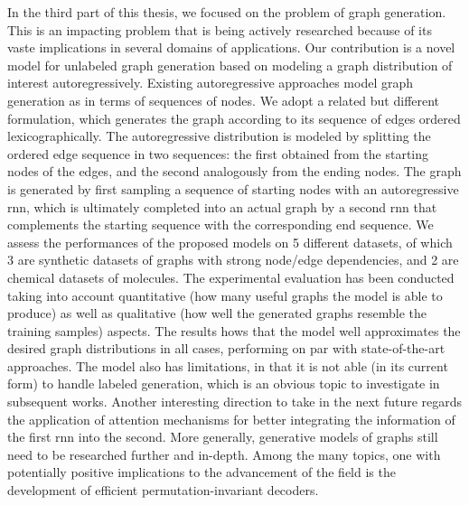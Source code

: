 In the third part of this thesis, we focused on the problem of graph generation. This is an impacting problem that is being actively researched because of its vaste implications in several domains of applications. Our contribution is a novel model for unlabeled graph generation based on modeling a graph distribution of interest autoregressively. Existing autoregressive approaches model graph generation as in terms of sequences of nodes. We adopt a related but different formulation, which generates the graph according to its sequence of edges ordered lexicographically. The autoregressive distribution is modeled by splitting the ordered edge sequence in two sequences: the first obtained from the starting nodes of the edges, and the second analogously from the ending nodes. The graph is generated by first sampling a sequence of starting nodes with an autoregressive \gls{rnn}, which is ultimately completed into an actual graph by a second \gls{rnn} that complements the starting sequence with the corresponding end sequence. We assess the performances of the proposed models on 5 different datasets, of which 3 are synthetic datasets of graphs with strong node/edge dependencies, and 2 are chemical datasets of molecules. The experimental evaluation has been conducted taking into account quantitative (\ie how many useful graphs the model is able to produce) as well as qualitative (\ie how well the generated graphs resemble the training samples) aspects. The results hows that the model well approximates the desired graph distributions in all cases, performing on par with state-of-the-art approaches. The model also has limitations, in that it is not able (in its current form) to handle labeled generation, which is an obvious topic to investigate in subsequent works. Another interesting direction to take in the next future regards the application of attention mechanisms for better integrating the information of the first \gls{rnn} into the second. More generally, generative models of graphs still need to be researched further and in-depth. Among the many topics, one with potentially positive implications to the advancement of the field is the development of efficient permutation-invariant decoders.

